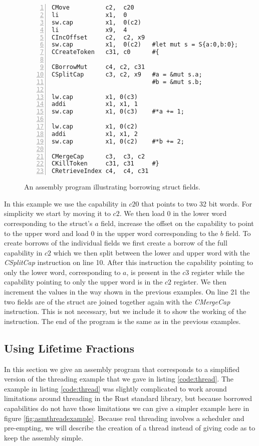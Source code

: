 \begin{figure}[h]
\begin{lstlisting}[style=custASM, numbers = left ,xleftmargin=1.5em]
CMove          c2,  c20
li             x1,  0
sw.cap         x1,  0(c2)
li             x9,  4
CIncOffset     c2,  c2, x9
sw.cap         x1,  0(c2)   #let mut s = S{a:0,b:0};
CCreateToken   c31, c0      #{

CBorrowMut     c4, c2, c31
CSplitCap      c3, c2, x9   #a = &mut s.a;
                            #b = &mut s.b;

lw.cap         x1, 0(c3)
addi           x1, x1, 1
sw.cap         x1, 0(c3)    #*a += 1;

lw.cap         x1, 0(c2)
addi           x1, x1, 2
sw.cap         x1, 0(c2)    #*b += 2;

CMergeCap      c3,  c3, c2
CKillToken     c31, c31     #}
CRetrieveIndex c4,  c4, c31
\end{lstlisting}
\caption{An assembly program illustrating borrowing struct fields.}
\label{fig:asmstructexample}
\end{figure}

In this example we use the capability in $c20$ that points to two 32 bit words.
For simplicity we start by moving it to $c2$.
We then load 0 in the lower word corresponding to the struct's $a$ field, increase the offset on the capability to point to the upper word and load 0 in the upper word corresponding to the $b$ field.
To create borrows of the individual fields we first create a borrow of the full capability in $c2$ which we then split between the lower and upper word with the \textit{CSplitCap} instruction on line 10.
After this instruction the capability pointing to only the lower word, corresponding to $a$, is present in the $c3$ register while the capability pointing to only the upper word is in the $c2$ register.
We then increment the values in the way shown in the previous examples.
On line 21 the two fields are of the struct are joined together again with the \textit{CMergeCap} instruction.
This is not necessary, but we include it to show the working of the instruction.
The end of the program is the same as in the previous examples.

\subsection{Using Lifetime Fractions}
In this section we give an assembly program that corresponds to a simplified version of the threading example that we gave in listing \ref{code:thread}.
The example in listing \ref{code:thread} was slightly complicated to work around limitations around threading in the Rust standard library, but because borrowed capabilities do not have those limitations we can give a simpler example here in figure \ref{fig:asmthreadexample}.
Because real threading involves a scheduler and pre-empting, we will describe the creation of a thread instead of giving code as to keep the assembly simple.

